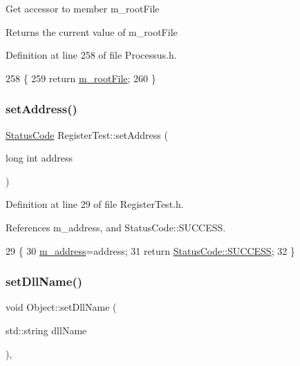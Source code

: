 Get accessor to member m\+\_\+root\+File \begin{DoxyReturn}{Returns}
the current value of m\+\_\+root\+File 
\end{DoxyReturn}


Definition at line 258 of file Processus.\+h.


\begin{DoxyCode}
258                      \{
259     \textcolor{keywordflow}{return} \hyperlink{classProcessus_a76114f8cf2111e910c323a7ae05a015d}{m\_rootFile};
260   \}
\end{DoxyCode}
\mbox{\label{classRegisterTest_a5ed3012183069fb4c76580efcf4cec3a}} 
\subsubsection{\texorpdfstring{set\+Address()}{setAddress()}}
{\footnotesize\ttfamily \hyperlink{classStatusCode}{Status\+Code} Register\+Test\+::set\+Address (\begin{DoxyParamCaption}\item[{long int}]{address }\end{DoxyParamCaption})\hspace{0.3cm}{\ttfamily [inline]}}



Definition at line 29 of file Register\+Test.\+h.



References m\+\_\+address, and Status\+Code\+::\+S\+U\+C\+C\+E\+SS.


\begin{DoxyCode}
29                                            \{
30     \hyperlink{classRegisterTest_a1a227f5fe12e8cfc284a904bb9f7e109}{m\_address}=address;
31     \textcolor{keywordflow}{return} \hyperlink{classStatusCode_a6f565cbeadc76d14c72f047e5e85eb4badd0da38d3ba0d922efd1f4619bc37ad8}{StatusCode::SUCCESS};
32   \}
\end{DoxyCode}
\mbox{\label{classObject_a870c5af919958c2136623b2d7816d123}} 
\subsubsection{\texorpdfstring{set\+Dll\+Name()}{setDllName()}}
{\footnotesize\ttfamily void Object\+::set\+Dll\+Name (\begin{DoxyParamCaption}\item[{std\+::string}]{dll\+Name }\end{DoxyParamCaption})\hspace{0.3cm}{\ttfamily [inline]}, {\ttfamily [inherited]}}

